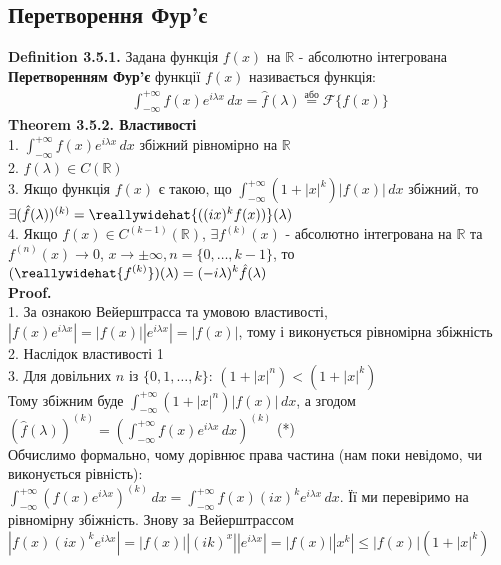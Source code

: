 \documentclass{math_library}
\begin{document}
\subsection{Перетворення Фур'є}
\textbf{Definition 3.5.1.} Задана функція $f(x)$ на $\mathbb{R}$ - абсолютно інтегрована\\
\textbf{Перетворенням Фур'є} функції $f(x)$ називається функція:
\begin{align*}
\int_{-\infty}^{+\infty} f(x)e^{i \lambda x}\,dx = \hat{f}(\lambda) \overset{\textrm{або}}{=} \mathscr{F}\{f(x)\}
\end{align*}
\textbf{Theorem 3.5.2. Властивості}\\
1. $\displaystyle \int_{-\infty}^{+\infty} f(x)e^{i \lambda x}\,dx$ збіжний рівномірно на $\mathbb{R}$
\bigskip \\
2. $\hat{f}(\lambda) \in C(\mathbb{R})$
\bigskip \\
3. Якщо функція $f(x)$ є такою, що $\displaystyle \int_{-\infty}^{+\infty} (1+|x|^k) |f(x)| \,dx$ збіжний, то $\exists (\hat{f}(\lambda))^{(k)} = \reallywidehat{((ix)^k f(x))}(\lambda)$
\bigskip \\
4. Якщо $f(x) \in C^{(k-1)}(\mathbb{R})$, $\exists f^{(k)}(x)$ - абсолютно інтегрована на $\mathbb{R}$ та $f^{(n)}(x) \to 0$, $x \to \pm \infty, n=\{0,\dots, k-1\}$, то $\displaystyle (\reallywidehat{f^{(k)}})(\lambda) = (-i \lambda)^k \hat{f}(\lambda)$\\
\textbf{Proof.}\\
1. За ознакою Вейерштрасса та умовою властивості, $|f(x)e^{i \lambda x}| = |f(x)| |e^{i \lambda x}| = |f(x)|$, тому і виконується рівномірна збіжність
\bigskip \\
2. Наслідок властивості 1
\bigskip \\
3. Для довільних $n$ із $\{0,1,\dots,k\}$: $(1+|x|^n) < (1+|x|^k)$\\
Тому збіжним буде $\displaystyle \int_{-\infty}^{+\infty} (1+|x|^n) |f(x)| \,dx$, а згодом\\
$\displaystyle (\hat{f}(\lambda))^{(k)}= \left(\int_{-\infty}^{+\infty} f(x)e^{i \lambda x}\,dx  \right)^{(k)}$ (*)\\
Обчислимо формально, чому дорівнює права частина (нам поки невідомо, чи виконується рівність):\\
$\displaystyle \int_{-\infty}^{+\infty} \left( f(x)e^{i \lambda x} \right)^{(k)}\,dx = \int_{-\infty}^{+\infty} f(x) (ix)^k e^{i \lambda x} \,dx$. Її ми перевіримо на рівномірну збіжність. Знову за Вейерштрассом\\
$\displaystyle |f(x) (ix)^k e^{i \lambda x}| = |f(x)| |(ik)^x| |e^{i \lambda x}| = |f(x)| |x^k| \leq |f(x)| (1+ |x|^k)$\\
\end{document}
